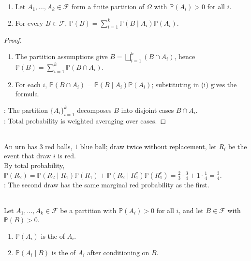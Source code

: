 \begin{theorem} \label{thm:law-of-total-probability} 
\begin{enumerate}[label=(\roman*)]
\setlength{\itemsep}{0pt}
\item
Let $A_1,\ldots,A_k\in\mathcal{F}$ form a finite partition of $\Omega$ with $\mathbb{P}(A_i)>0$ for all $i$.
\item
For every $B\in\mathcal{F}$, $\mathbb{P}(B)=\sum\limits_{i=1}^{k}\mathbb{P}(B\mid A_i)\mathbb{P}(A_i)$.
\end{enumerate}
\begin{proof}
\begin{enumerate}[label=(\roman*)]
\setlength{\itemsep}{0pt}
\item
The partition assumptions give $B=\bigsqcup\limits_{i=1}^k(B\cap A_i)$, hence $\mathbb{P}(B)=\sum\limits_{i=1}^k\mathbb{P}(B\cap A_i)$.
\item
For each $i$, $\mathbb{P}(B\cap A_i)=\mathbb{P}(B\mid A_i)\mathbb{P}(A_i)$; substituting in (i) gives the formula.
\end{enumerate}
: The partition $\{A_i\}_{i=1}^k$ decomposes $B$ into disjoint cases $B\cap A_i$.\\
: Total probability is weighted averaging over cases.
\end{proof}
\end{theorem}

\begin{example} \label{ex:second-draw-red-total-probability} \\
An urn has $3$ red balls, $1$ blue ball; draw twice without replacement, let $R_i$ be the event that draw $i$ is red.\\
By total probability, $\mathbb{P}(R_2)=\mathbb{P}(R_2\mid R_1)\mathbb{P}(R_1)+\mathbb{P}(R_2\mid R_1^c)\mathbb{P}(R_1^c)=\frac23\cdot\frac34+1\cdot\frac14=\frac34$.\\
: The second draw has the same marginal red probability as the first.
\end{example}

\begin{definition} \label{def:prior-and-posterior-probabilities} \\
Let $A_1,\ldots,A_k\in\mathcal{F}$ be a partition with $\mathbb{P}(A_i)>0$ for all $i$, and let $B\in\mathcal{F}$ with $\mathbb{P}(B)>0$.
\begin{enumerate}[label=(\roman*)]
\setlength{\itemsep}{0pt}
\item $\mathbb{P}(A_i)$ is the  of $A_i$.
\item $\mathbb{P}(A_i\mid B)$ is the  of $A_i$ after conditioning on $B$.
\end{enumerate}
\end{definition}

